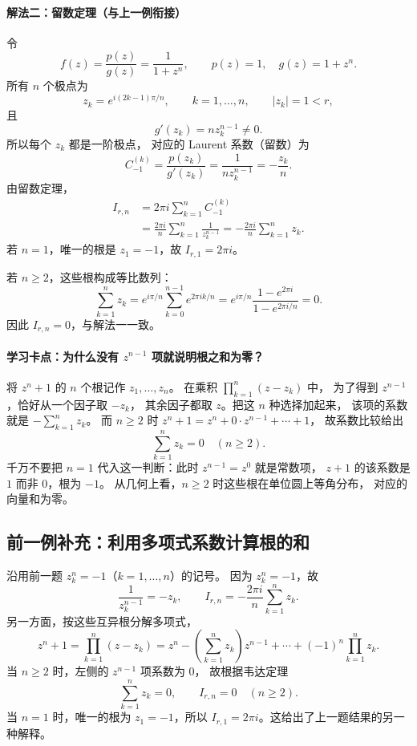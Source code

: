 \paragraph{解法二：留数定理（与上一例衔接）}
令
\[
  f(z)=\frac{p(z)}{g(z)}=\frac{1}{1+z^n},
  \qquad p(z)=1,\quad g(z)=1+z^n.
\]
所有 $n$ 个极点为
\[
  z_k=e^{i(2k-1)\pi/n},\qquad k=1,\ldots,n,
  \qquad |z_k|=1<r,
\]
且
\[
  g'(z_k)=nz_k^{n-1}\ne0.
\]
所以每个 $z_k$ 都是一阶极点，
对应的 Laurent 系数（留数）为
\[
  C_{-1}^{(k)}
    =\frac{p(z_k)}{g'(z_k)}
    =\frac{1}{nz_k^{n-1}}
    =-\frac{z_k}{n}.
\]
由留数定理，
\begin{align*}
  I_{r,n}
   &=2\pi i\sum_{k=1}^{n}C_{-1}^{(k)}\\
   &=\frac{2\pi i}{n}
      \sum_{k=1}^{n}\frac{1}{z_k^{n-1}}
    =-\frac{2\pi i}{n}\sum_{k=1}^{n}z_k.
\end{align*}
若 $n=1$，唯一的根是 $z_1=-1$，故
$I_{r,1}=2\pi i$。

若 $n\ge2$，这些根构成等比数列：
\[
  \sum_{k=1}^{n}z_k
  =e^{i\pi/n}\sum_{k=0}^{n-1}e^{2\pi ik/n}
  =e^{i\pi/n}
      \frac{1-e^{2\pi i}}{1-e^{2\pi i/n}}
  =0.
\]
因此 $I_{r,n}=0$，与解法一一致。



\paragraph{学习卡点：为什么没有 $z^{n-1}$ 项就说明根之和为零？}
将 $z^n+1$ 的 $n$ 个根记作 $z_1,\ldots,z_n$。
在乘积 $\prod_{k=1}^n(z-z_k)$ 中，
为了得到 $z^{n-1}$，恰好从一个因子取 $-z_k$，
其余因子都取 $z$。把这 $n$ 种选择加起来，
该项的系数就是 $-\sum_{k=1}^n z_k$。
而 $n\ge2$ 时
$z^n+1=z^n+0\cdot z^{n-1}+\cdots+1$，
故系数比较给出
\[
  \boxed{\sum_{k=1}^n z_k=0\quad(n\ge2).}
\]
千万不要把 $n=1$ 代入这一判断：此时
$z^{n-1}=z^0$ 就是常数项，
$z+1$ 的该系数是 $1$ 而非 $0$，根为 $-1$。
从几何上看，$n\ge2$ 时这些根在单位圆上等角分布，
对应的向量和为零。


\subsection*{前一例补充：利用多项式系数计算根的和}
沿用前一题 $z_k^n=-1$（$k=1,\ldots,n$）的记号。
因为 $z_k^n=-1$，故
\[
   \frac1{z_k^{n-1}}=-z_k,
   \qquad
   I_{r,n}=-\frac{2\pi i}{n}\sum_{k=1}^{n}z_k.
\]
另一方面，按这些互异根分解多项式，
\[
  z^n+1=\prod_{k=1}^{n}(z-z_k)
  =z^n-\left(\sum_{k=1}^{n}z_k\right)z^{n-1}
  +\cdots+(-1)^n\prod_{k=1}^{n}z_k.
\]
当 $n\ge2$ 时，左侧的 $z^{n-1}$ 项系数为 $0$，
故根据韦达定理
\[
  \sum_{k=1}^{n}z_k=0,\qquad I_{r,n}=0\quad(n\ge2).
\]
当 $n=1$ 时，唯一的根为 $z_1=-1$，所以
$I_{r,1}=2\pi i$。这给出了上一题结果的另一种解释。

